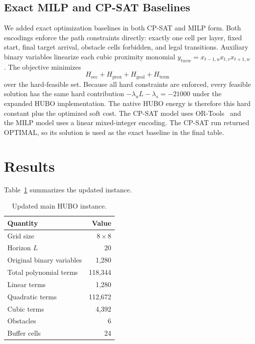 \documentclass[10pt,conference]{IEEEtran}
\begin{document}
\subsection{Exact MILP and CP-SAT Baselines}
We added exact optimization baselines in both CP-SAT and MILP form. Both encodings enforce the path constraints directly: exactly one cell per layer, fixed start, final target arrival, obstacle cells forbidden, and legal transitions. Auxiliary binary variables linearize each cubic proximity monomial $y_{tuvw}=x_{t-1,u}x_{t,v}x_{t+1,w}$. The objective minimizes
\begin{equation}
H_{\mathrm{occ}}+H_{\mathrm{prox}}+H_{\mathrm{goal}}+H_{\mathrm{term}}
\end{equation}
over the hard-feasible set. Because all hard constraints are enforced, every feasible solution has the same hard contribution $-\lambda_u L-\lambda_s=-21000$ under the expanded HUBO implementation. The native HUBO energy is therefore this hard constant plus the optimized soft cost. The CP-SAT model uses OR-Tools~\cite{ortools} and the MILP model uses a linear mixed-integer encoding. The CP-SAT run returned OPTIMAL, so its solution is used as the exact baseline in the final table.

\section{Results}
Table~\ref{tab:instance} summarizes the updated instance.
\begin{table}[t]
\caption{Updated main HUBO instance.}
\label{tab:instance}
\centering
\begin{tabular}{lr}
\toprule
Quantity & Value\\
\midrule
Grid size & $8\times 8$\\
Horizon $L$ & 20\\
Original binary variables & 1,280\\
Total polynomial terms & 118,344\\
Linear terms & 1,280\\
Quadratic terms & 112,672\\
Cubic terms & 4,392\\
Obstacles & 6\\
Buffer cells & 24\\
\bottomrule
\end{tabular}
\end{table}
\end{document}
